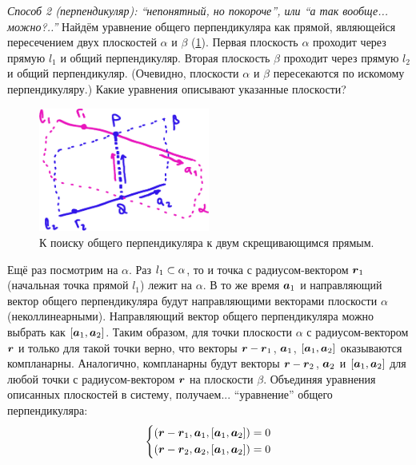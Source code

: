 \documentclass[a4paper,12pt]{article}
\begin{document}
\begin{solution}
    \medskip
    
    \emph{Способ 2 (перпендикуляр): ``непонятный, но покороче'', или ``а так вообще... можно?..''}
    Найдём уравнение общего перпендикуляра как прямой, являющейся пересечением двух плоскостей $\alpha$ и $\beta$ (\ref{fig:skew-alpha-beta}).
    Первая плоскость $\alpha$ проходит через прямую $l_1$ и общий перпендикуляр.
    Вторая плоскость $\beta$ проходит через прямую $l_2$ и общий перпендикуляр.
    (Очевидно, плоскости $\alpha$ и $\beta$ пересекаются по искомому перпендикуляру.)
    Какие уравнения описывают указанные плоскости?
    
    \begin{figure}[h]
      \centering
      
      \includegraphics[width=0.5\textwidth]{skew-alpha-beta}
      
      \caption{К поиску общего перпендикуляра к двум скрещивающимся прямым.}
      \label{fig:skew-alpha-beta}
    \end{figure}
    
    Ещё раз посмотрим на $\alpha$.
    Раз $l_1 \hm\subset \alpha$, то и точка с радиусом-вектором $\boldsymbol r_1$ (начальная точка прямой $l_1$) лежит на $\alpha$.
    В то же время $\boldsymbol a_1$ и направляющий вектор общего перпендикуляра будут направляющими векторами плоскости $\alpha$ (неколлинеарными).
    Направляющий вектор общего перпендикуляра можно выбрать как $[\boldsymbol a_1, \boldsymbol a_2]$.
    Таким образом, для точки плоскости $\alpha$ с радиусом-вектором $\boldsymbol r$ и только для такой точки верно, что векторы $\bds r \hm- \bds r_1$, $\boldsymbol a_1$, $[\boldsymbol a_1, \boldsymbol a_2]$ оказываются компланарны.
    Аналогично, компланарны будут векторы $\bds r \hm- \bds r_2$, $\boldsymbol a_2$ и $[\boldsymbol a_1, \boldsymbol a_2]$ для любой точки с радиусом-вектором $\boldsymbol r$ на плоскости $\beta$.
    Объединяя уравнения описанных плоскостей в систему, получаем... ``уравнение'' общего перпендикуляра:
    \[
      \left\{
        \begin{aligned}
          &(\boldsymbol r - \boldsymbol r_1, \boldsymbol a_1, [\boldsymbol a_1, \boldsymbol a_2]) = 0\\
          &(\boldsymbol r - \boldsymbol r_2, \boldsymbol a_2, [\boldsymbol a_1, \boldsymbol a_2]) = 0
        \end{aligned}
      \right.
    \]
    

\end{solution}
\end{document}
